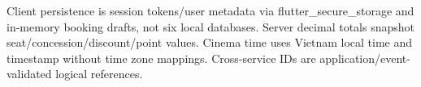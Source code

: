 Client persistence is session tokens/\allowbreak{}user metadata via flutter\_secure\_storage and in-memory booking drafts, not six local databases. Server decimal totals snapshot seat/\allowbreak{}concession/\allowbreak{}discount/\allowbreak{}point values. Cinema time uses Vietnam local time and timestamp without time zone mappings. Cross-service IDs are application/\allowbreak{}event-validated logical references.
